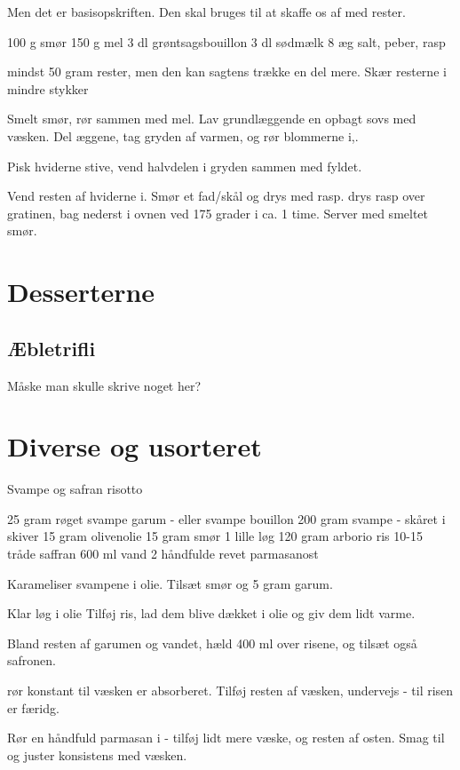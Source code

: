\documentclass[
]{book}
\begin{document}
Men det er basisopskriften. Den skal bruges til at skaffe os af med rester.

100 g smør
150 g mel
3 dl grøntsagsbouillon
3 dl sødmælk
8 æg
salt, peber, rasp

mindst 50 gram rester, men den kan sagtens trække en del mere.
Skær resterne i mindre stykker

Smelt smør, rør sammen med mel. Lav grundlæggende en opbagt
sovs med væsken.
Del æggene, tag gryden af varmen, og rør blommerne i,.

Pisk hviderne stive, vend halvdelen i gryden sammen med fyldet.

Vend resten af hviderne i. Smør et fad/skål
og drys med rasp. drys rasp over gratinen, bag nederst i ovnen
ved 175 grader i ca. 1 time. Server med smeltet smør.

\hypertarget{desserterne}{%
\chapter{Desserterne}\label{desserterne}}

\hypertarget{uxe6bletrifli}{%
\section{Æbletrifli}\label{uxe6bletrifli}}

Måske man skulle skrive noget her?

\hypertarget{diverse-og-usorteret}{%
\chapter{Diverse og usorteret}\label{diverse-og-usorteret}}

Svampe og safran risotto

25 gram røget svampe garum - eller svampe bouillon
200 gram svampe - skåret i skiver
15 gram olivenolie
15 gram smør
1 lille løg
120 gram arborio ris
10-15 tråde saffran
600 ml vand
2 håndfulde revet parmasanost

Karameliser svampene i olie.
Tilsæt smør og 5 gram garum.

Klar løg i olie
Tilføj ris, lad dem blive dækket i olie og giv dem lidt varme.

Bland resten af garumen og vandet, hæld 400 ml over risene, og
tilsæt også safronen.

rør konstant til væsken er absorberet. Tilføj resten af
væsken, undervejs - til risen er færidg.

Rør en håndfuld parmasan i - tilføj lidt mere væske, og
resten af osten. Smag til og juster konsistens med væsken.
\end{document}
